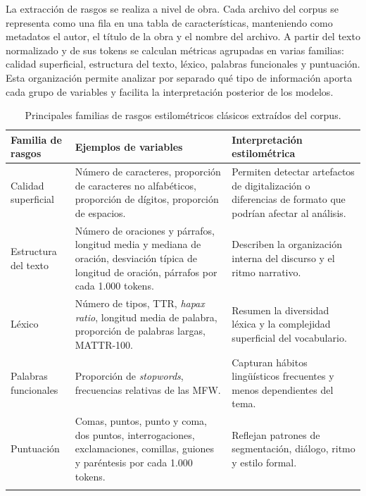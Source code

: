 \documentclass[IB]{TFUOC}%
\begin{document}
La extracción de rasgos se realiza a nivel de obra. Cada archivo del corpus se representa como una fila en una tabla de características, manteniendo como metadatos el autor, el título de la obra y el nombre del archivo. A partir del texto normalizado y de sus tokens se calculan métricas agrupadas en varias familias: calidad superficial, estructura del texto, léxico, palabras funcionales y puntuación. Esta organización permite analizar por separado qué tipo de información aporta cada grupo de variables y facilita la interpretación posterior de los modelos.

\begin{longtable}{|p{3.8cm}|p{5.5cm}|p{5.8cm}|}
\hline
\textbf{Familia de rasgos} & \textbf{Ejemplos de variables} & \textbf{Interpretación estilométrica} \\
\hline

Calidad superficial &
Número de caracteres, proporción de caracteres no alfabéticos, proporción de dígitos, proporción de espacios. &
Permiten detectar artefactos de digitalización o diferencias de formato que podrían afectar al análisis. \\
\hline

Estructura del texto &
Número de oraciones y párrafos, longitud media y mediana de oración, desviación típica de longitud de oración, párrafos por cada 1.000 tokens. &
Describen la organización interna del discurso y el ritmo narrativo. \\
\hline

Léxico &
Número de tipos, TTR, \textit{hapax ratio}, longitud media de palabra, proporción de palabras largas, MATTR-100. &
Resumen la diversidad léxica y la complejidad superficial del vocabulario. \\
\hline

Palabras funcionales &
Proporción de \textit{stopwords}, frecuencias relativas de las MFW. &
Capturan hábitos lingüísticos frecuentes y menos dependientes del tema. \\
\hline

Puntuación &
Comas, puntos, punto y coma, dos puntos, interrogaciones, exclamaciones, comillas, guiones y paréntesis por cada 1.000 tokens. &
Reflejan patrones de segmentación, diálogo, ritmo y estilo formal. \\
\hline

\caption{Principales familias de rasgos estilométricos clásicos extraídos del corpus.}
\label{tab:rasgos-clasicos}
\end{longtable}
\end{document}
